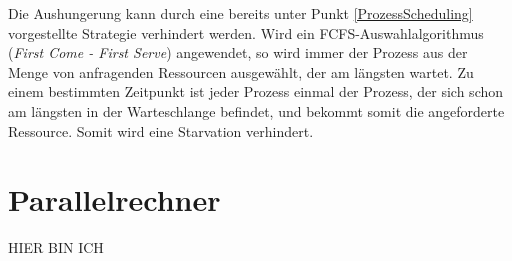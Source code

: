 				Die Aushungerung kann durch eine bereits unter Punkt \ref{ProzessScheduling} vorgestellte Strategie verhindert werden. Wird ein FCFS-Auswahlalgorithmus (\textit{First Come - First Serve}) angewendet, so wird immer der Prozess aus der Menge von anfragenden Ressourcen ausgewählt, der am längsten wartet. Zu einem bestimmten Zeitpunkt ist jeder Prozess einmal der Prozess, der sich schon am längsten in der Warteschlange befindet, und bekommt somit die angeforderte Ressource. Somit wird eine Starvation verhindert.
				
	\section{Parallelrechner}
		
		HIER BIN ICH